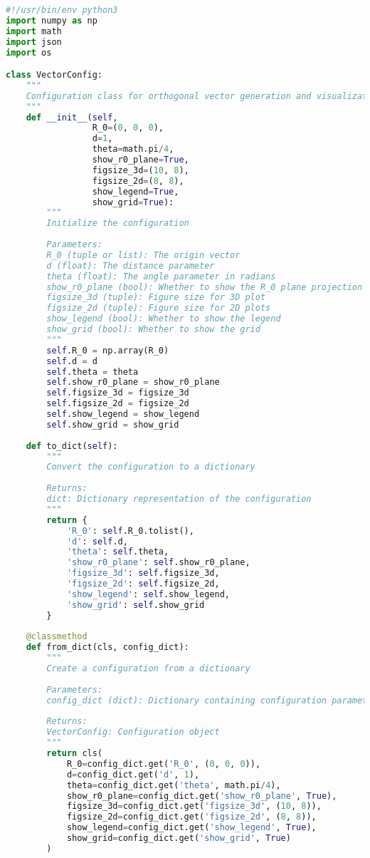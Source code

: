 \begin{lstlisting}[language=Python]
#!/usr/bin/env python3
import numpy as np
import math
import json
import os

class VectorConfig:
    """
    Configuration class for orthogonal vector generation and visualization
    """
    def __init__(self, 
                 R_0=(0, 0, 0), 
                 d=1, 
                 theta=math.pi/4,
                 show_r0_plane=True,
                 figsize_3d=(10, 8),
                 figsize_2d=(8, 8),
                 show_legend=True,
                 show_grid=True):
        """
        Initialize the configuration
        
        Parameters:
        R_0 (tuple or list): The origin vector
        d (float): The distance parameter
        theta (float): The angle parameter in radians
        show_r0_plane (bool): Whether to show the R_0 plane projection
        figsize_3d (tuple): Figure size for 3D plot
        figsize_2d (tuple): Figure size for 2D plots
        show_legend (bool): Whether to show the legend
        show_grid (bool): Whether to show the grid
        """
        self.R_0 = np.array(R_0)
        self.d = d
        self.theta = theta
        self.show_r0_plane = show_r0_plane
        self.figsize_3d = figsize_3d
        self.figsize_2d = figsize_2d
        self.show_legend = show_legend
        self.show_grid = show_grid
    
    def to_dict(self):
        """
        Convert the configuration to a dictionary
        
        Returns:
        dict: Dictionary representation of the configuration
        """
        return {
            'R_0': self.R_0.tolist(),
            'd': self.d,
            'theta': self.theta,
            'show_r0_plane': self.show_r0_plane,
            'figsize_3d': self.figsize_3d,
            'figsize_2d': self.figsize_2d,
            'show_legend': self.show_legend,
            'show_grid': self.show_grid
        }
    
    @classmethod
    def from_dict(cls, config_dict):
        """
        Create a configuration from a dictionary
        
        Parameters:
        config_dict (dict): Dictionary containing configuration parameters
        
        Returns:
        VectorConfig: Configuration object
        """
        return cls(
            R_0=config_dict.get('R_0', (0, 0, 0)),
            d=config_dict.get('d', 1),
            theta=config_dict.get('theta', math.pi/4),
            show_r0_plane=config_dict.get('show_r0_plane', True),
            figsize_3d=config_dict.get('figsize_3d', (10, 8)),
            figsize_2d=config_dict.get('figsize_2d', (8, 8)),
            show_legend=config_dict.get('show_legend', True),
            show_grid=config_dict.get('show_grid', True)
        )
    

\end{lstlisting}
